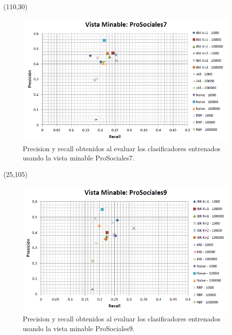 \documentclass{article}
\begin{document}
\begin{textblock}{80}(110,30)
\begin{figure}[!htb]
\begin{centering}
\includegraphics[scale=0.4]{prosociales7}
\par\end{centering}
\caption{Precision y recall obtenidos al evaluar los clasificadores entrenados usando la vista minable ProSociales7.}
\label{fig:figura18}
\end{figure}
\end{textblock}

\begin{textblock}{80}(25,105)
\begin{figure}[!htb]
\begin{centering}
\includegraphics[scale=0.4]{prosociales9}
\par\end{centering}
\caption{Precision y recall obtenidos al evaluar los clasificadores entrenados usando la vista minable ProSociales9.}
\label{fig:figura19}
\end{figure}
\end{textblock}
\end{document}
